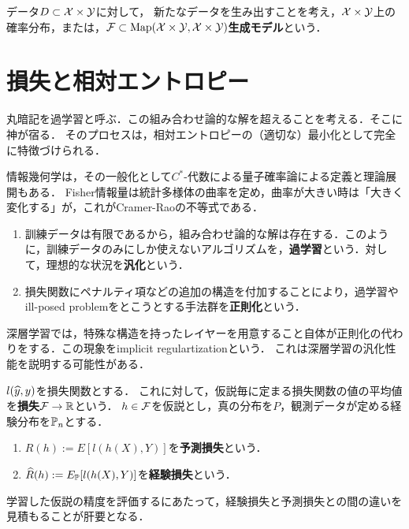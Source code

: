\documentclass[uplatex,dvipdfmx]{jsreport}
\begin{document}
\begin{definition}
    データ$D\subset\mathcal{X}\times\mathcal{Y}$に対して，
    新たなデータを生み出すことを考え，$\mathcal{X}\times\mathcal{Y}$上の確率分布，または，$\mathcal{F}\subset\mathrm{Map}(\mathcal{X}\times\mathcal{Y},\mathcal{X}\times\mathcal{Y})$\textbf{生成モデル}という．
\end{definition}

\section{損失と相対エントロピー}

\begin{tcolorbox}[colframe=ForestGreen, colback=ForestGreen!10!white,breakable,colbacktitle=ForestGreen!40!white,coltitle=black,fonttitle=\bfseries\sffamily,
title=]
    丸暗記を過学習と呼ぶ．この組み合わせ論的な解を超えることを考える．そこに神が宿る．
    そのプロセスは，相対エントロピーの（適切な）最小化として完全に特徴づけられる．

    情報幾何学は，その一般化として$C^*$-代数による量子確率論による定義と理論展開もある．
    Fisher情報量は統計多様体の曲率を定め，曲率が大きい時は「大きく変化する」が，これがCramer-Raoの不等式である．
\end{tcolorbox}

\begin{definition}\mbox{}
    \begin{enumerate}
        \item 訓練データは有限であるから，組み合わせ論的な解は存在する．このように，訓練データのみにしか使えないアルゴリズムを，\textbf{過学習}という．対して，理想的な状況を\textbf{汎化}という．
        \item 損失関数にペナルティ項などの追加の構造を付加することにより，過学習やill-posed problemをとこうとする手法群を\textbf{正則化}という．
    \end{enumerate}
\end{definition}
\begin{remark}
    深層学習では，特殊な構造を持ったレイヤーを用意すること自体が正則化の代わりをする．この現象をimplicit regulartizationという．
    これは深層学習の汎化性能を説明する可能性がある．
\end{remark}

\begin{definition}
    $l(\widehat{y},y)$を損失関数とする．
    これに対して，仮説毎に定まる損失関数の値の平均値を\textbf{損失}$\mathcal{F}\to\mathbb{R}$という．
    $h\in\mathcal{F}$を仮説とし，真の分布を$P$，観測データが定める経験分布を$\mathbb{P}_n$とする．
    \begin{enumerate}
        \item $R(h):=E[l(h(X),Y)]$を\textbf{予測損失}という．
        \item $\widehat{R}(h):=E_{\mathbb{P}}[l(h(X),Y)]$を\textbf{経験損失}という．
    \end{enumerate}
\end{definition}
\begin{remarks}
    学習した仮説の精度を評価するにあたって，経験損失と予測損失との間の違いを見積もることが肝要となる．
\end{remarks}
\end{document}
